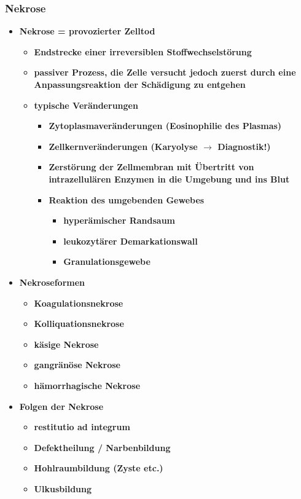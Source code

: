 \subsubsection{Nekrose}
	\begin{itemize}
		\item \textbf{Nekrose = provozierter Zelltod}
			\begin{itemize}
				\item \textbf{Endstrecke einer irreversiblen Stoffwechselstörung}
				\item \textbf{passiver Prozess, die Zelle versucht jedoch zuerst durch eine Anpassungsreaktion der Schädigung zu entgehen}
				\item \textbf{typische Veränderungen}
					\begin{itemize}
						\item \textbf{Zytoplasmaveränderungen (Eosinophilie des Plasmas)}
						\item \textbf{Zellkernveränderungen (Karyolyse $\rightarrow$ Diagnostik!)}
						\item \textbf{Zerstörung der Zellmembran mit Übertritt von intrazellulären Enzymen in die Umgebung und ins Blut}
						\item \textbf{Reaktion des umgebenden Gewebes}
							\begin{itemize}
								\item \textbf{hyperämischer Randsaum}
								\item \textbf{leukozytärer Demarkationswall}
								\item \textbf{Granulationsgewebe}
							\end{itemize}
					\end{itemize}
			\end{itemize}
		\item \textbf{Nekroseformen}
			\begin{itemize}
				\item \textbf{Koagulationsnekrose}
				\item \textbf{Kolliquationsnekrose}
				\item \textbf{käsige Nekrose}
				\item \textbf{gangränöse Nekrose}
				\item \textbf{hämorrhagische Nekrose}
			\end{itemize}
		\item \textbf{Folgen der Nekrose}
			\begin{itemize}
				\item \textbf{restitutio ad integrum}
				\item \textbf{Defektheilung / Narbenbildung}
				\item \textbf{Hohlraumbildung (Zyste etc.)}
				\item \textbf{Ulkusbildung}
			\end{itemize}
	\end{itemize}

